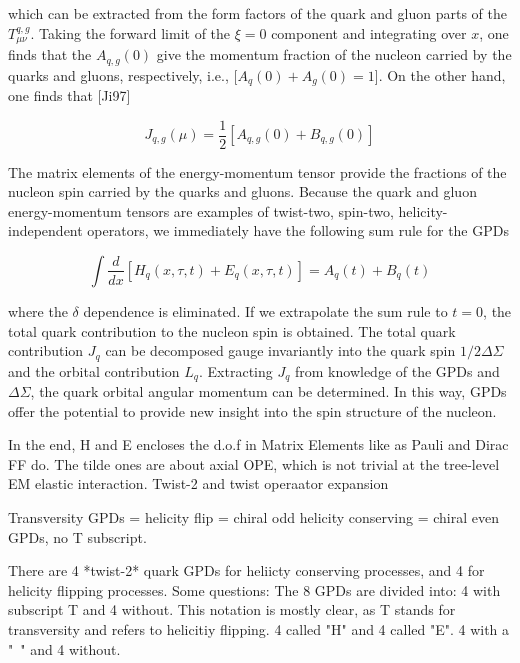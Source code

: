             which can be extracted from the form factors of the quark and gluon parts of the $T_{\mu \nu}^{q,g}$. Taking the forward limit of the $\xi = 0$ component and integrating over $x$, one finds that the $A_{q,g}(0)$ give the momentum fraction of the nucleon carried by the quarks and gluons, respectively, i.e., [$A_q(0) + A_g(0) = 1$]. On the other hand, one finds that [Ji97]
            
            \begin{equation}
            J_{q,g}(\mu) = \frac{1}{2}[A_{q,g}(0) + B_{q,g}(0)]
            \end{equation}
            
            The matrix elements of the energy-momentum tensor provide the fractions of the nucleon spin carried by the quarks and gluons. Because the quark and gluon energy-momentum tensors are examples of twist-two, spin-two, helicity-independent operators, we immediately have the following sum rule for the GPDs
            
            \begin{equation}
                \int \frac{d}{dx}[H_{q}(x, \tau, t) + E_{q}(x, \tau, t)] = A_{q}(t) + B_{q}(t)
            \end{equation}
            
            where the $\delta$ dependence is eliminated. If we extrapolate the sum rule to $t = 0$, the total quark contribution to the nucleon spin is obtained. The total quark contribution $J_q$ can be decomposed gauge invariantly into the quark spin $1/2\Delta\Sigma$ and the orbital contribution $L_q$. Extracting $J_q$ from knowledge of the GPDs and $\Delta\Sigma$, the quark orbital angular momentum can be determined. In this way, GPDs offer the potential to provide new insight into the spin structure of the nucleon.


  \iffalse
            In the end, H and E encloses the d.o.f in Matrix Elements like as Pauli and Dirac FF do. The tilde ones are about axial OPE, which is not trivial at the tree-level EM elastic interaction. 
            Twist-2 and twist operaator expansion
    
        
                    Transversity GPDs = helicity flip = chiral odd
                    helicity conserving = chiral even GPDs, no T subscript. 
            
            There are 4 *twist-2* quark GPDs for heliicty conserving processes, and 4 for helicity flipping processes. Some questions:
            The 8 GPDs are divided into: 4 with subscript T and 4 without. This notation is mostly clear, as T stands for transversity and refers to helicitiy flipping.  4 called "H" and 4 called "E".  4 with a "~" and 4 without. 
            
